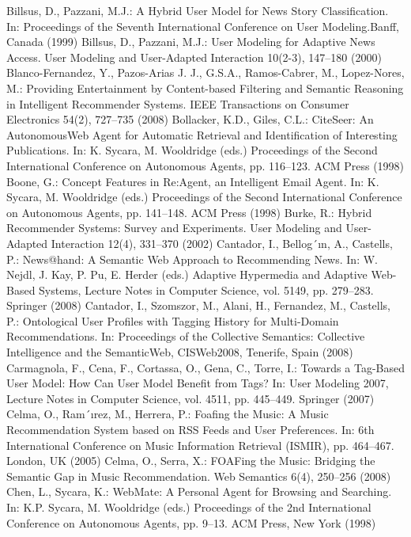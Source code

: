 \begin{thebibliography}{110}
Billsus, D., Pazzani, M.J.: A Hybrid User Model for News Story Classification. In: Proceedings of the Seventh International Conference on User Modeling.Banff, Canada (1999)
Billsus, D., Pazzani, M.J.: User Modeling for Adaptive News Access. User Modeling and User-Adapted Interaction 10(2-3), 147–180 (2000)
Blanco-Fernandez, Y., Pazos-Arias J. J., G.S.A., Ramos-Cabrer, M., Lopez-Nores, M.: Providing Entertainment by Content-based Filtering and Semantic Reasoning in Intelligent Recommender Systems. IEEE Transactions on Consumer Electronics 54(2), 727–735 (2008)
Bollacker, K.D., Giles, C.L.: CiteSeer: An AutonomousWeb Agent for Automatic Retrieval and Identification of Interesting Publications. In: K. Sycara, M. Wooldridge (eds.) Proceedings of the Second International Conference on Autonomous Agents, pp. 116–123. ACM Press (1998)
Boone, G.: Concept Features in Re:Agent, an Intelligent Email Agent. In: K. Sycara, M. Wooldridge (eds.) Proceedings of the Second International Conference on Autonomous Agents, pp. 141–148. ACM Press (1998)
Burke, R.: Hybrid Recommender Systems: Survey and Experiments. User Modeling and User-Adapted Interaction 12(4), 331–370 (2002)
Cantador, I., Bellog´ın, A., Castells, P.: News@hand: A Semantic Web Approach to Recommending News. In: W. Nejdl, J. Kay, P. Pu, E. Herder (eds.) Adaptive Hypermedia and Adaptive Web-Based Systems, Lecture Notes in Computer Science, vol. 5149, pp. 279–283. Springer (2008)
Cantador, I., Szomszor, M., Alani, H., Fernandez, M., Castells, P.: Ontological User Profiles with Tagging History for Multi-Domain Recommendations. In: Proceedings of the Collective Semantics: Collective Intelligence and the SemanticWeb, CISWeb2008, Tenerife, Spain (2008)
Carmagnola, F., Cena, F., Cortassa, O., Gena, C., Torre, I.: Towards a Tag-Based User Model: How Can User Model Benefit from Tags? In: User Modeling 2007, Lecture Notes in Computer Science, vol. 4511, pp. 445–449. Springer (2007)
Celma, O., Ram´ırez, M., Herrera, P.: Foafing the Music: A Music Recommendation System based on RSS Feeds and User Preferences. In: 6th International Conference on Music Information Retrieval (ISMIR), pp. 464–467. London, UK (2005)
Celma, O., Serra, X.: FOAFing the Music: Bridging the Semantic Gap in Music Recommendation. Web Semantics 6(4), 250–256 (2008)
Chen, L., Sycara, K.: WebMate: A Personal Agent for Browsing and Searching. In: K.P. Sycara, M. Wooldridge (eds.) Proceedings of the 2nd International Conference on Autonomous Agents, pp. 9–13. ACM Press, New York (1998)

\end{thebibliography}
